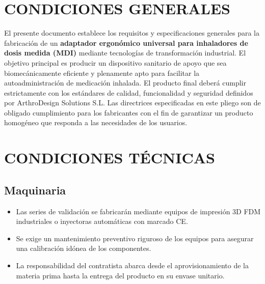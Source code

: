 \documentclass[11pt,a4paper]{article}
\begin{document}
\tableofcontents
\thispagestyle{fancy}
\newpage



\pagestyle{fancy} 

\section{CONDICIONES GENERALES}
El presente documento establece los requisitos y especificaciones generales para la fabricación de un \textbf{ adaptador ergonómico universal para inhaladores de dosis medida (MDI)} mediante tecnologías de transformación industrial. El objetivo principal es producir un dispositivo sanitario de apoyo que sea biomecánicamente eficiente y plenamente apto para facilitar la autoadministración de medicación inhalada. El producto final deberá cumplir estrictamente con los estándares de calidad, funcionalidad y seguridad definidos por ArthroDesign Solutions S.L. Las directrices especificadas en este pliego son de obligado cumplimiento para los fabricantes con el fin de garantizar un producto homogéneo que responda a las necesidades de los usuarios.
\section{CONDICIONES TÉCNICAS}

\subsection{Maquinaria}
\begin{itemize}
    \item Las series de validación se fabricarán mediante equipos de impresión 3D FDM industriales o inyectoras automáticas con marcado CE.
    \item Se exige un mantenimiento preventivo riguroso de los equipos para asegurar una calibración idónea de los componentes.
    \item La responsabilidad del contratista abarca desde el aprovisionamiento de la materia prima hasta la entrega del producto en su envase unitario.
\end{itemize}
\end{document}
